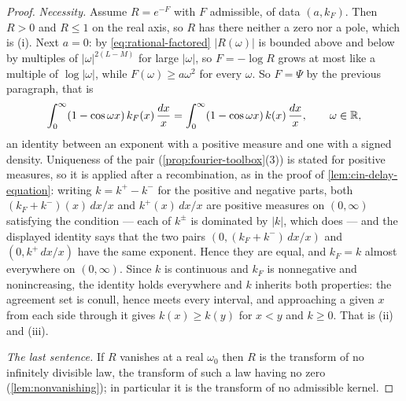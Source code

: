 \begin{proof}
\emph{Necessity.} Assume $R = e^{-F}$ with $F$ admissible, of data $(a,k_F)$. Then $R > 0$ and
$R \le 1$ on the real axis, so $R$ has there neither a zero nor a pole, which is (i). Next
$a = 0$: by \ref{eq:rational-factored} $|R(\omega)|$ is bounded above and below by multiples of
$|\omega|^{2(L-M)}$ for large $|\omega|$, so $F = -\log R$ grows at most like a multiple of
$\log|\omega|$, while $F(\omega) \ge a\omega^2$ for every $\omega$. So $F = \Psi$ by the previous
paragraph, that is
\[
  \int_0^\infty (1 - \cos\omega x)\,k_F(x)\,\frac{dx}{x}
   = \int_0^\infty (1 - \cos\omega x)\,k(x)\,\frac{dx}{x}, \qquad \omega \in \mathbb{R} ,
\]
an identity between an exponent with a positive \Levy{} measure and one with a signed density.
Uniqueness of the \Levy{} pair (\ref{prop:fourier-toolbox}(3)) is stated for positive measures, so
it is applied after a recombination, as in the proof of \ref{lem:cin-delay-equation}: writing
$k = k^{+} - k^{-}$ for the positive and negative parts, both $(k_F + k^{-})(x)\,dx/x$ and
$k^{+}(x)\,dx/x$ are positive measures on $(0,\infty)$ satisfying the \Levy{} condition --- each
of $k^{\pm}$ is dominated by $|k|$, which does --- and the displayed identity says that the two
pairs $(0, (k_F+k^{-})\,dx/x)$ and $(0, k^{+}\,dx/x)$ have the same exponent. Hence they are
equal, and $k_F = k$ almost everywhere on $(0,\infty)$. Since $k$ is continuous and $k_F$ is
nonnegative and nonincreasing, the identity holds everywhere and $k$ inherits both properties:
the agreement set is conull, hence meets every interval, and approaching a given $x$ from each
side through it gives $k(x) \ge k(y)$ for $x < y$ and $k \ge 0$. That is (ii) and (iii).

\emph{The last sentence.} If $R$ vanishes at a real $\omega_0$ then $R$ is the transform of no
infinitely divisible law, the transform of such a law having no zero (\ref{lem:nonvanishing}); in
particular it is the transform of no admissible kernel.
\end{proof}

